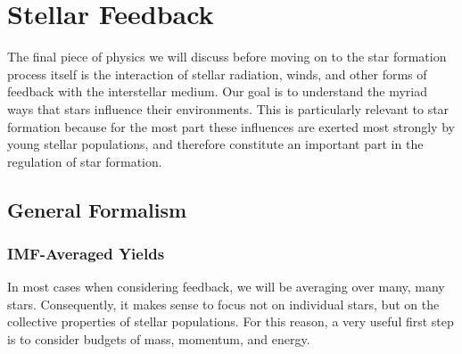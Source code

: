 \chapter{Stellar Feedback}
\label{ch:feedback}


The final piece of physics we will discuss before moving on to the star formation process itself is the interaction of stellar radiation, winds, and other forms of feedback with the interstellar medium. Our goal is to understand the myriad ways that stars influence their environments. This is particularly relevant to star formation because for the most part these influences are exerted most strongly by young stellar populations, and therefore constitute an important part in the regulation of star formation.

\section{General Formalism}

\subsection{IMF-Averaged Yields}

In most cases when considering feedback, we will be averaging over many, many stars. Consequently, it makes sense to focus not on individual stars, but on the collective properties of stellar populations. For this reason, a very useful first step is to consider budgets of mass, momentum, and energy.

